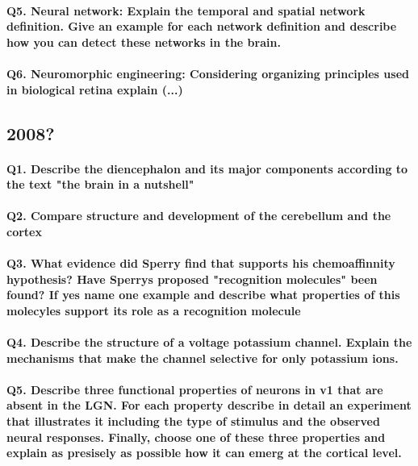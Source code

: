 \documentclass[12pt,article,oneside,a4paper]{memoir}
\begin{document}
\paragraph{Q5. Neural network: Explain the temporal and spatial network definition. Give an example for each network definition and describe how you can detect these networks in the brain.}
\paragraph{Q6. Neuromorphic engineering: Considering organizing principles used in biological retina explain (...)}

\subsection{2008?}
\paragraph{Q1. Describe the diencephalon and its major components according to the text "the brain in a nutshell"}
\paragraph{Q2. Compare structure and development of the cerebellum and the cortex}
\paragraph{Q3. What evidence did Sperry find that supports his chemoaffinnity hypothesis? Have Sperrys proposed "recognition molecules" been found? If yes name one example and describe what properties of this molecyles support its role as a recognition molecule}
\paragraph{Q4. Describe the structure of a voltage potassium channel. Explain the mechanisms that make the channel selective for only potassium ions.}
\paragraph{Q5. Describe three functional properties of neurons in v1 that are absent in the LGN. For each property describe in detail an experiment that illustrates it including the type of stimulus and the observed neural responses. Finally, choose one of these three properties and explain as presisely as possible how it can emerg at the cortical level.}
\end{document}
